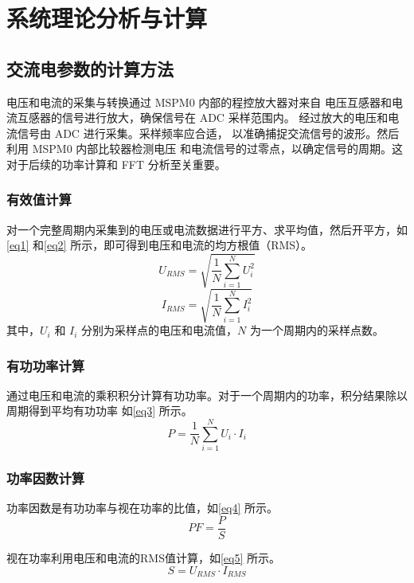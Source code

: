 \documentclass[a4paper,12pt,UTF8]{article}
\begin{document}
\section{系统理论分析与计算}
\subsection{交流电参数的计算方法}
电压和电流的采集与转换通过 MSPM0 内部的程控放大器对来自
电压互感器和电流互感器的信号进行放大，确保信号在 ADC 采样范围内。
经过放大的电压和电流信号由 ADC 进行采集。采样频率应合适，
以准确捕捉交流信号的波形。然后利用 MSPM0 内部比较器检测电压
和电流信号的过零点，以确定信号的周期。这对于后续的功率计算和 FFT 分析至关重要。
\subsubsection{有效值计算}
对一个完整周期内采集到的电压或电流数据进行平方、求平均值，然后开平方，如\autoref{eq1} 
和\autoref{eq2} 所示，即可得到电压和电流的均方根值（RMS）。
\begin{equation}
    U_{RMS} = \sqrt{\frac{1}{N}\sum_{i=1}^{N} U_i^2}
    \label{eq1}
\end{equation}
\begin{equation}
    I_{RMS} = \sqrt{\frac{1}{N}\sum_{i=1}^{N} I_i^2}
    \label{eq2}
\end{equation}
其中，$U_i$ 和 $I_i$ 分别为采样点的电压和电流值，$N$ 为一个周期内的采样点数。

\subsubsection{有功功率计算}
通过电压和电流的乘积积分计算有功功率。对于一个周期内的功率，积分结果除以周期得到平均有功功率
如\autoref{eq3} 所示。
\begin{equation}
    P = \frac{1}{N} \sum_{i=1}^{N} U_i \cdot I_i
    \label{eq3}
\end{equation}

\subsubsection{功率因数计算}
功率因数是有功功率与视在功率的比值，如\autoref{eq4} 所示。
\begin{equation}
    PF = \frac{P}{S}
    \label{eq4}
\end{equation}

视在功率利用电压和电流的RMS值计算，如\autoref{eq5} 所示。
\begin{equation}
    S = U_{RMS} \cdot I_{RMS}
    \label{eq5}
\end{equation}
\end{document}
